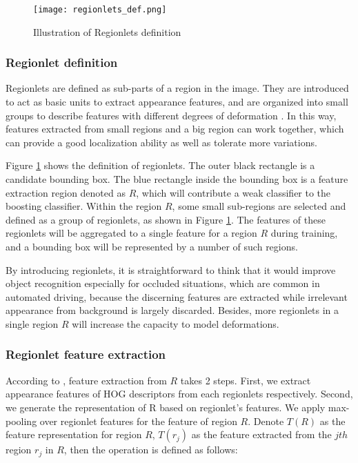 \documentclass{article} %
\begin{document}
\begin{figure}[htb]
	\centering
	\texttt{[image: regionlets\_def.png]}
	\caption{Illustration of Regionlets definition}
	\label{fig:regionlet_def}
\end{figure}


\subsubsection{Regionlet definition}

Regionlets are defined as sub-parts of a region in the image. They are introduced to act as basic units to extract appearance features, and are organized into small groups to describe features with different degrees of deformation \cite{Wang2013}. In this way, features extracted from small regions and a big region can work together, which can provide a good localization ability as well as tolerate more variations.

Figure \ref{fig:regionlet_def} shows the definition of regionlets. The outer black rectangle is a candidate bounding box. The blue rectangle inside the bounding box is a feature extraction region denoted as $R$, which will contribute a weak classifier to the boosting classifier. Within the region $R$, some small sub-regions are selected and defined as a group of regionlets, as shown in Figure \ref{fig:regionlet_def}. The features of these regionlets will be aggregated to a single feature for a region $R$ during training, and a bounding box will be represented by a number of such regions.

By introducing regionlets, it is straightforward to think that it would improve object recognition especially for occluded situations, which are common in automated driving, because the discerning features are extracted while irrelevant appearance from background is largely discarded. Besides, more regionlets in a single region $R$ will increase the capacity to model deformations.


\subsubsection{Regionlet feature extraction}

According to \cite{Wang2013}, feature extraction from $R$ takes 2 steps. First, we extract appearance features of HOG descriptors \cite{dalal2005histograms} from each regionlets respectively. Second, we generate the representation of R based on regionlet’s features. We apply max-pooling over regionlet features for the feature of region $R$. Denote $T(R)$ as the feature representation for region $R$, $T(r_j)$ as the feature extracted from the $jth$ region $r_j$ in $R$, then the operation is defined as follows:
\end{document}
